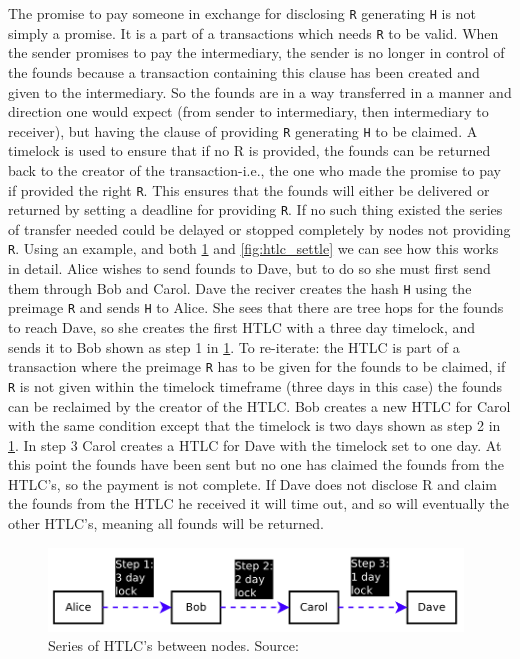 The promise to pay someone in exchange for disclosing {\tt R} generating {\tt H} is not simply a promise. It is a part of a transactions which needs {\tt R} to be valid. When the sender promises to pay the intermediary, the sender is no longer in control of the founds because a transaction containing this clause has been created and given to the intermediary. So the founds are in a way transferred in a manner and direction one would expect (from sender to intermediary, then intermediary to receiver), but having the clause of providing {\tt R} generating {\tt H} to be claimed. A timelock is used to ensure that if no R is provided, the founds can be returned back to the creator of the transaction-i.e., the one who made the promise to pay if provided the right {\tt R}. This ensures that the founds will either be delivered or returned by setting a deadline for providing {\tt R}. If no such thing existed the series of transfer needed could be delayed or stopped completely by nodes not providing {\tt R}.
Using an example, and both \cref{fig:htlc_promise} and \cref{fig:htlc_settle} we can see how this works in detail.
Alice wishes to send founds to Dave, but to do so she must first send them through Bob and Carol. Dave the reciver creates the hash {\tt H} using the preimage {\tt R} and sends {\tt H} to Alice. She sees that there are tree hops for the founds to reach Dave, so she creates the first HTLC with a three day timelock, and sends it to Bob shown as step 1 in \cref{fig:htlc_promise}. To re-iterate: the HTLC is part of a transaction where the preimage {\tt R} has to be given for the founds to be claimed, if {\tt R} is not given within the timelock timeframe (three days in this case) the founds can be reclaimed by the creator of the HTLC. Bob creates a new HTLC for Carol with the same condition except that the timelock is two days shown as step 2 in \cref{fig:htlc_promise}. In step 3 Carol creates a HTLC for Dave with the timelock set to one day. At this point the founds have been sent but no one has claimed the founds from the HTLC's, so the payment is not complete. If Dave does not disclose R and claim the founds from the HTLC he received it will time out, and so will eventually the other HTLC's, meaning all founds will be returned.
\\

\begin{figure}[ht]
    \centering
    \includegraphics[width=11cm]{figures/htlc_promise.png}
    \caption{Series of HTLC's between nodes. Source: \cite{poon2015bitcoin}}
    \label{fig:htlc_promise}
\end{figure}

